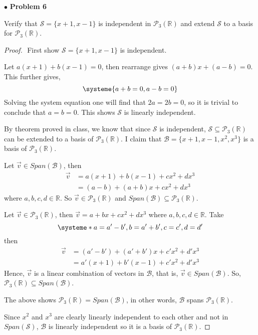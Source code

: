 \documentclass{article}
\begin{document}
\newpage
$ \bullet$ \textbf{Problem 6}
\medskip

\begin{itshape}
Verify that $\mathcal{S} = \{ x+1, x-1 \}$ is independent in $\mathcal{P}_{3} (\mathbb{R})$ and extend $\mathcal{S}$ to a basis for $\mathcal{P}_{3} (\mathbb{R})$.
\end{itshape}
\medskip

\begin{proof}
$ $\newline
First show $\mathcal{S} = \{ x+1 , x-1 \} $ is independent. 

Let $a(x+1) + b(x-1) = 0$, then rearrange gives $(a+b)x + (a-b) =0$. This further gives,
\[
\systeme{a+b=0,a-b=0}
\]
Solving the system equation one will find that $2a=2b=0$, so it is trivial to conclude that $a=b=0$. This shows $\mathcal{S}$ is linearly independent.
\bigskip

By theorem proved in class, we know that since $\mathcal{S}$ is independent, $\mathcal{S} \subseteq \mathcal{P}_3(\mathbb{R})$ can be extended to a basis of $\mathcal{P}_3(\mathbb{R})$. I claim that $\mathcal{B} = \{ x+1, x-1, x^2, x^3 \}$ is a basis of $\mathcal{P}_3(\mathbb{R})$.

Let $\vec{v} \in Span(\mathcal{B})$, then
\begin{align*}
\vec{v} &= a(x+1)+b(x-1)+cx^2+dx^3 \\
&= (a-b)+(a+b)x+cx^2+dx^3
\end{align*}
where $a,b,c,d \in \mathbb{R}$. So $\vec{v} \in \mathcal{P}_3(\mathbb{R})$ and $Span(\mathcal{B}) \subseteq \mathcal{P}_3(\mathbb{R})$.

Let $\vec{v} \in \mathcal{P}_3(\mathbb{R})$, then $\vec{v} = a+bx+cx^2+dx^3$ where $a,b,c,d \in \mathbb{R}$. Take
\[ 
\systeme*{a = a'-b', b = a'+b', c=c', d=d'}
\]
then
\begin{align*}
\vec{v} &= (a'-b') + (a'+b')x + c'x^2+d'x^3 \\
&= a'(x+1)+b'(x-1)+c'x^2+d'x^3
\end{align*}
Hence, $\vec{v}$ is a linear combination of vectors in $\mathcal{B}$, that is, $\vec{v} \in Span(\mathcal{B})$. So, $\mathcal{P}_3(\mathbb{R}) \subseteq Span(\mathcal{B})$.

The above shows $\mathcal{P}_3(\mathbb{R}) = Span(\mathcal{B})$, in other words, $\mathcal{B}$ spans $\mathcal{P}_3(\mathbb{R})$.

Since $x^2$ and $x^3$ are clearly linearly independent to each other and not in $Span(\mathcal{S})$, $\mathcal{B}$ is linearly independent so it is a basis of $\mathcal{P}_3(\mathbb{R})$.
\end{proof}
\end{document}

